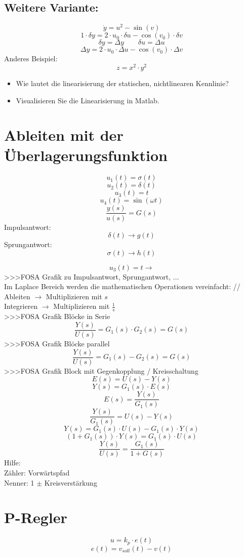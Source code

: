 \subsection{Weitere Variante: }
\[ \dot{y} = u^2 - \sin(v) \]
\[ 1 \cdot \delta y = 2 \cdot u_0 \cdot \delta u - \cos(v_0) \cdot \delta v \]
\[ \delta y = \Delta y \qquad \delta u = \Delta u \]
\[ \Delta y = 2 \cdot u_0 \cdot \Delta u - \cos(v_0) \cdot \Delta v \]
Anderes Beispiel: 
\[ z = x^2 \cdot y^2 \]
\begin{itemize}
  \item Wie lautet die linearisierung der statischen, nichtlinearen Kennlinie? 
  \item Visualisieren Sie die Linearisierung in Matlab. 
\end{itemize}

\section{Ableiten mit der Überlagerungsfunktion}
\[ u_1(t) = \sigma(t) \]
\[ u_2(t) = \delta(t) \]
\[ u_3(t) = t \]
\[ u_4(t) = \sin(\omega t) \]
\[ \frac{y(s)}{u(s)} = G(s) \]
Impulsantwort: 
\[ \delta(t) \to g(t) \]
Sprungantwort: 
\[ \sigma(t) \to h(t) \]

\[ u_3(t) = t \to  \]
>>>FOSA Grafik zu Impulsantwort, Sprungantwort, ...\\
Im Laplace Bereich werden die mathematischen Operationen vereinfacht: //
Ableiten $\to$ Multiplizieren mit $s$\\
Integrieren $\to$ Multiplizieren mit $\frac{1}{s}$\\
>>>FOSA Grafik Blöcke in Serie\\
\[ \frac{Y(s)}{U(s)} = G_1(s) \cdot G_2(s) = G(s) \]
>>>FOSA Grafik Blöcke parallel\\
\[ \frac{Y(s)}{U(s)} = G_1(s) - G_2(s) = G(s) \]
>>>FOSA Grafik Block mit Gegenkopplung / Kreisschaltung\\
\[ E(s) = U(s) - Y(s) \]
\[ Y(s) = G_1(s) \cdot E(s) \]
\[ E(s) = \frac{Y(s)}{G_1(s)} \]
\[ \frac{Y(s)}{G_1(s)} = U(s) - Y(s) \]
\[ Y(s) = G_1(s) \cdot U(s) - G_1(s) \cdot Y(s) \]
\[ (1 + G_1(s)) \cdot Y(s) = G_1(s) \cdot U(s) \]
\[ \frac{Y(s)}{U(s)} = \frac{G_1(s)}{1 + G(s)} \]
Hilfe: \\
Zähler: Vorwärtspfad\\
Nenner: 1 $\pm$ Kreisverstärkung

\section{P-Regler}
\[ u = k_p \cdot e(t) \]
\[ e(t) = v_{soll}(t) - v(t) \]


